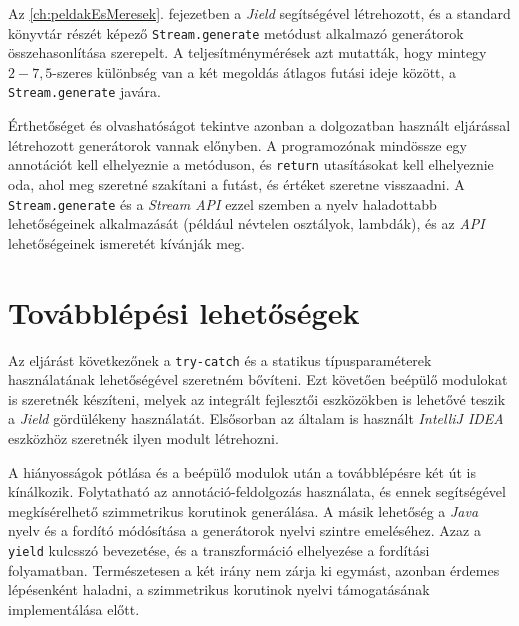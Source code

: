 Az \ref{ch:peldakEsMeresek}. fejezetben a \textit{Jield} segítségével létrehozott, és a standard könyvtár részét képező \texttt{Stream.generate} metódust alkalmazó generátorok összehasonlítása szerepelt. A teljesítménymérések azt mutatták, hogy mintegy $2-7,5$-szeres különbség van a két megoldás átlagos futási ideje között, a \texttt{Stream.generate} javára. 

Érthetőséget és olvashatóságot tekintve azonban a dolgozatban használt eljárással létrehozott generátorok vannak előnyben. A programozónak mindössze egy annotációt kell elhelyeznie a metóduson, és \texttt{return} utasításokat kell elhelyeznie oda, ahol meg szeretné szakítani a futást, és értéket szeretne visszaadni. A \texttt{Stream.generate} és a \textit{Stream API} ezzel szemben a nyelv haladottabb lehetőségeinek alkalmazását (például névtelen osztályok, lambdák), és az \textit{API} lehetőségeinek ismeretét kívánják meg.

\section{Továbblépési lehetőségek}

Az eljárást következőnek a \texttt{try-catch} és a statikus típusparaméterek használatának lehetőségével szeretném bővíteni. Ezt követően beépülő modulokat is szeretnék készíteni, melyek az integrált fejlesztői eszközökben is lehetővé teszik a \textit{Jield} gördülékeny használatát. Elsősorban az általam is használt \textit{IntelliJ IDEA} eszközhöz szeretnék ilyen modult létrehozni. 

A hiányosságok pótlása és a beépülő modulok után a továbblépésre két út is kínálkozik. Folytatható az annotáció-feldolgozás használata, és ennek segítségével megkísérelhető szimmetrikus korutinok generálása. A másik lehetőség a \textit{Java} nyelv és a fordító módósítása a generátorok nyelvi szintre emeléséhez. Azaz a \texttt{yield} kulcsszó bevezetése, és a transzformáció elhelyezése a fordítási folyamatban. Természetesen a két irány nem zárja ki egymást, azonban érdemes lépésenként haladni, a szimmetrikus korutinok nyelvi támogatásának implementálása előtt.